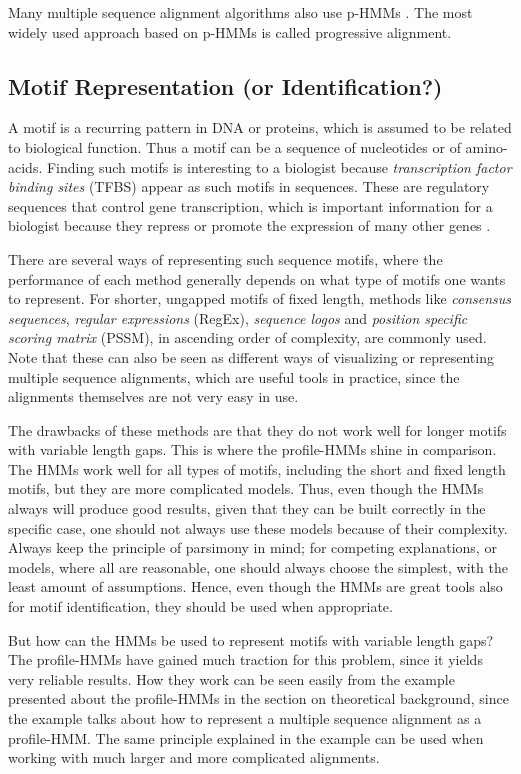 \documentclass{article}
\begin{document}
Many multiple sequence alignment algorithms also use p-HMMs \cite{Yoon2009}. The most widely used approach based on p-HMMs is called progressive alignment. 

\subsection{Motif Representation (or Identification?)}
A motif is a recurring pattern in DNA or proteins, which is assumed to be related to biological function. Thus a motif can be a sequence of nucleotides or of amino-acids. Finding such motifs is interesting to a biologist because \textit{transcription factor binding sites} (TFBS) appear as such motifs in sequences. These are regulatory sequences that control gene transcription, which is important information for a biologist because they repress or promote the expression of many other genes \cite{Christianini2006}.

There are several ways of representing such sequence motifs, where the performance of each method generally depends on what type of motifs one wants to represent. For shorter, ungapped motifs of fixed length, methods like \textit{consensus sequences}, \textit{regular expressions} (RegEx), \textit{sequence logos} and \textit{position specific scoring matrix} (PSSM), in ascending order of complexity, are commonly used. Note that these can also be seen as different ways of visualizing or representing multiple sequence alignments, which are useful tools in practice, since the alignments themselves are not very easy in use. 

The drawbacks of these methods are that they do not work well for longer motifs with variable length gaps. This is where the profile-HMMs shine in comparison. The HMMs work well for all types of motifs, including the short and fixed length motifs, but they are more complicated models. Thus, even though the HMMs always will produce good results, given that they can be built correctly in the specific case, one should not always use these models because of their complexity. Always keep the principle of parsimony in mind; for competing explanations, or models, where all are reasonable, one should always choose the simplest, with the least amount of assumptions. Hence, even though the HMMs are great tools also for motif identification, they should be used when appropriate. 

But how can the HMMs be used to represent motifs with variable length gaps? The profile-HMMs have gained much traction for this problem, since it yields very reliable results. How they work can be seen easily from the example presented about the profile-HMMs in the section on theoretical background, since the example talks about how to represent a multiple sequence alignment as a profile-HMM. The same principle explained in the example can be used when working with much larger and more complicated alignments. 
\end{document}
